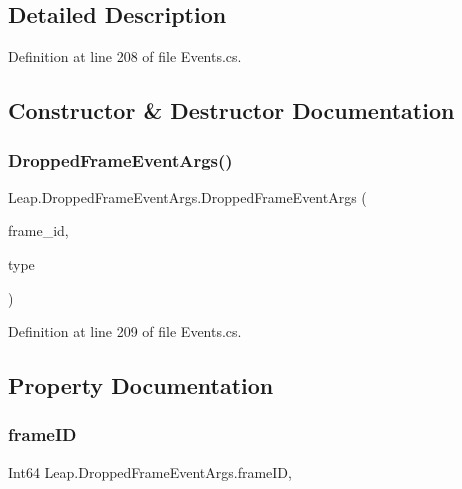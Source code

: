 \subsection{Detailed Description}


Definition at line 208 of file Events.\+cs.



\subsection{Constructor \& Destructor Documentation}
\mbox{\label{class_leap_1_1_dropped_frame_event_args_aa4561f67dfb5dbd521c42e027a95eed0}} 
\subsubsection{\texorpdfstring{DroppedFrameEventArgs()}{DroppedFrameEventArgs()}}
{\footnotesize\ttfamily Leap.\+Dropped\+Frame\+Event\+Args.\+Dropped\+Frame\+Event\+Args (\begin{DoxyParamCaption}\item[{Int64}]{frame\+\_\+id,  }\item[{\mbox{\hyperlink{namespace_leap_internal_af32f98bc0f7257d572aa3f3c3dac43a3}{e\+Leap\+Dropped\+Frame\+Type}}}]{type }\end{DoxyParamCaption})}



Definition at line 209 of file Events.\+cs.



\subsection{Property Documentation}
\mbox{\label{class_leap_1_1_dropped_frame_event_args_afc68d607a7839f8e76ad0027148bf803}} 
\subsubsection{\texorpdfstring{frameID}{frameID}}
{\footnotesize\ttfamily Int64 Leap.\+Dropped\+Frame\+Event\+Args.\+frame\+ID\hspace{0.3cm}{\ttfamily [get]}, {\ttfamily [set]}}



